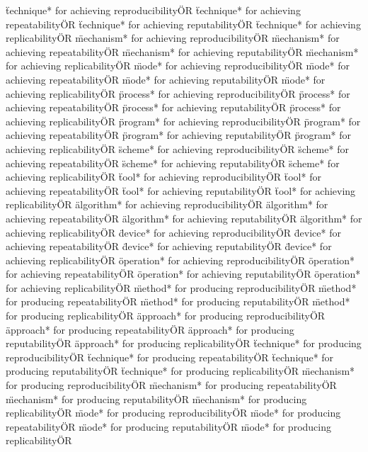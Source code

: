 \documentclass[
10pt, %
a4paper, %
oneside, %
headinclude,footinclude, %
BCOR5mm, %
]{scrartcl}
\begin{document}
\"technique* for achieving reproducibility\" OR \"technique* for achieving repeatability\" OR \"technique* for achieving reputability\" OR \"technique* for achieving replicability\" OR 
\"mechanism* for achieving reproducibility\" OR \"mechanism* for achieving repeatability\" OR \"mechanism* for achieving reputability\" OR \"mechanism* for achieving replicability\" OR 
\"mode* for achieving reproducibility\" OR \"mode* for achieving repeatability\" OR \"mode* for achieving reputability\" OR \"mode* for achieving replicability\" OR 
\"process* for achieving reproducibility\" OR \"process* for achieving repeatability\" OR \"process* for achieving reputability\" OR \"process* for achieving replicability\" OR 
\"program* for achieving reproducibility\" OR \"program* for achieving repeatability\" OR \"program* for achieving reputability\" OR \"program* for achieving replicability\" OR 
\"scheme* for achieving reproducibility\" OR \"scheme* for achieving repeatability\" OR \"scheme* for achieving reputability\" OR \"scheme* for achieving replicability\" OR 
\"tool* for achieving reproducibility\" OR \"tool* for achieving repeatability\" OR \"tool* for achieving reputability\" OR \"tool* for achieving replicability\" OR 
\"algorithm* for achieving reproducibility\" OR \"algorithm* for achieving repeatability\" OR \"algorithm* for achieving reputability\" OR \"algorithm* for achieving replicability\" OR 
\"device* for achieving reproducibility\" OR \"device* for achieving repeatability\" OR \"device* for achieving reputability\" OR \"device* for achieving replicability\" OR 
\"operation* for achieving reproducibility\" OR \"operation* for achieving repeatability\" OR \"operation* for achieving reputability\" OR \"operation* for achieving replicability\" OR 
\"method* for producing reproducibility\" OR \"method* for producing repeatability\" OR \"method* for producing reputability\" OR \"method* for producing replicability\" OR 
\"approach* for producing reproducibility\" OR \"approach* for producing repeatability\" OR \"approach* for producing reputability\" OR \"approach* for producing replicability\" OR 
\"technique* for producing reproducibility\" OR \"technique* for producing repeatability\" OR \"technique* for producing reputability\" OR \"technique* for producing replicability\" OR 
\"mechanism* for producing reproducibility\" OR \"mechanism* for producing repeatability\" OR \"mechanism* for producing reputability\" OR \"mechanism* for producing replicability\" OR 
\"mode* for producing reproducibility\" OR \"mode* for producing repeatability\" OR \"mode* for producing reputability\" OR \"mode* for producing replicability\" OR 
\end{document}
